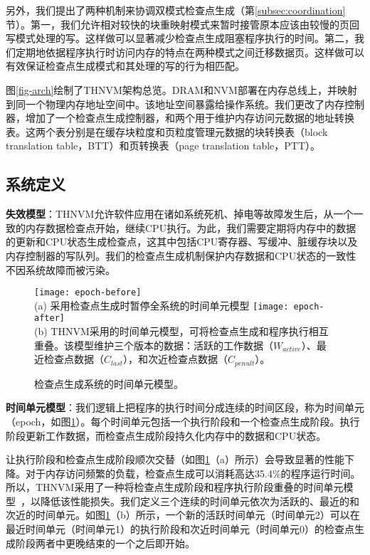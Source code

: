 另外，我们提出了两种机制来协调双模式检查点生成（第\ref{subsec:coordination}节）。第一，我们允许相对较快的块重映射模式来暂时接管原本应该由较慢的页回写模式处理的写。这样做可以显著减少检查点生成阻塞程序执行的时间。第二，我们定期地依据程序执行时访问内存的特点在两种模式之间迁移数据页。这样做可以有效保证检查点生成模式和其处理的写的行为相匹配。

图\ref{fig-arch}绘制了THNVM架构总览。DRAM和NVM部署在内存总线上，并映射到同一个物理内存地址空间中。该地址空间暴露给操作系统。我们更改了内存控制器，增加了一个检查点生成控制器，和两个用于维护内存访问元数据的地址转换表。这两个表分别是在缓存块粒度和页粒度管理元数据的块转换表（block translation table，BTT）和页转换表（page translation table，PTT）。

\subsection{系统定义}

\textbf{失效模型}：THNVM允许软件应用在诸如系统死机、掉电等故障发生后，从一个一致的内存数据检查点开始，继续CPU执行。为此，我们需要定期将内存中的数据的更新和CPU状态生成检查点，这其中包括CPU寄存器、写缓冲、脏缓存块以及内存控制器的写队列。我们的检查点生成机制保护内存数据和CPU状态的一致性不因系统故障而被污染。

\begin{figure}[!h]
\centering
\texttt{[image: epoch-before]}\\
{\small (a) 采用检查点生成时暂停全系统的时间单元模型}
\texttt{[image: epoch-after]}\\
{\small (b) THNVM采用的时间单元模型，可将检查点生成和程序执行相互重叠。该模型维护三个版本的数据：活跃的工作数据（$W_{active}$）、最近检查点数据（$C_{last}$），和次近检查点数据（$C_{penult}$）。\hfill}
\caption{检查点生成系统的时间单元模型。}
\label{fig-epoch}
\end{figure}

\textbf{时间单元模型}：我们逻辑上把程序的执行时间分成连续的时间区段，称为时间单元（epoch，如图\ref{fig-epoch}）。每个时间单元包括一个执行阶段和一个检查点生成阶段。执行阶段更新工作数据，而检查点生成阶段持久化内存中的数据和CPU状态。

让执行阶段和检查点生成阶段顺次交替（如图\ref{fig-epoch}（a）所示）会导致显著的性能下降。对于内存访问频繁的负载，检查点生成可以消耗高达35.4\%的程序运行时间。所以，THNVM采用了一种将检查点生成阶段和程序执行阶段重叠的时间单元模型~\cite{1003568}，以降低该性能损失。我们定义三个连续的时间单元依次为活跃的、最近的和次近的时间单元。如图\ref{fig-epoch}（b）所示，一个新的活跃时间单元（时间单元2）可以在最近时间单元（时间单元1）的执行阶段和次近时间单元（时间单元0）的检查点生成阶段两者中更晚结束的一个之后即开始。

